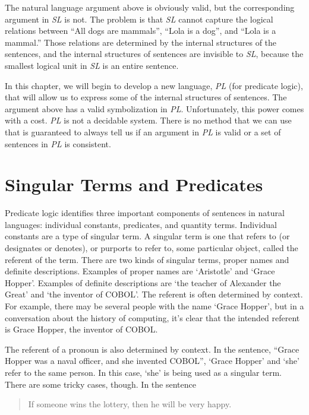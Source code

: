 \documentclass[../logic-text.tex]{subfiles}
\begin{document}
The natural language argument above is obviously valid, but the corresponding argument in \emph{SL} is not.
The problem is that \emph{SL} cannot capture the logical relations between \enquote{All dogs are mammals}, \enquote{Lola is a dog}, and \enquote{Lola is a mammal.}
Those relations are determined by the internal structures of the sentences, and the internal structures of sentences are invisible to \emph{SL}, because the smallest logical unit in \emph{SL} is an entire sentence.

In this chapter, we will begin to develop a new language, \emph{PL} (for predicate logic), that will allow us to express some of the internal structures of sentences.
The argument above has a valid symbolization in \emph{PL}.
Unfortunately, this power comes with a cost. \emph{PL} is not a decidable system. There is no method that we can use that is guaranteed to always tell us if an argument in \emph{PL} is valid or a set of sentences in \emph{PL} is consistent.


\section{Singular Terms and Predicates}
\label{sec:sing-terms-pred}

Predicate logic identifies three important components of sentences in natural languages: individual constants, predicates, and quantity terms.
Individual constants are a type of singular term.
A singular term is one that refers to (or designates or denotes), or purports to refer to, some particular object, called the referent of the term.
There are two kinds of singular terms, proper names and definite descriptions.
Examples of proper names are \enquote*{Aristotle} and \enquote*{Grace Hopper}.
Examples of definite descriptions are \enquote*{the teacher of Alexander the Great} and \enquote*{the inventor of COBOL}.
The referent is often determined by context.
For example, there may be several people with the name \enquote*{Grace Hopper}, but in a conversation about the history of computing, it's clear that the intended referent is Grace Hopper, the inventor of COBOL.


The referent of a pronoun is also determined by context.
In the sentence, \enquote{Grace Hopper was a naval officer, and she invented COBOL}, \enquote*{Grace Hopper} and \enquote*{she} refer to the same person.
In this case, \enquote*{she} is being used as a singular term.
There are some tricky cases, though.
In the sentence

\begin{quote}
If someone wins the lottery, then he will be very happy.
\end{quote}
\end{document}

